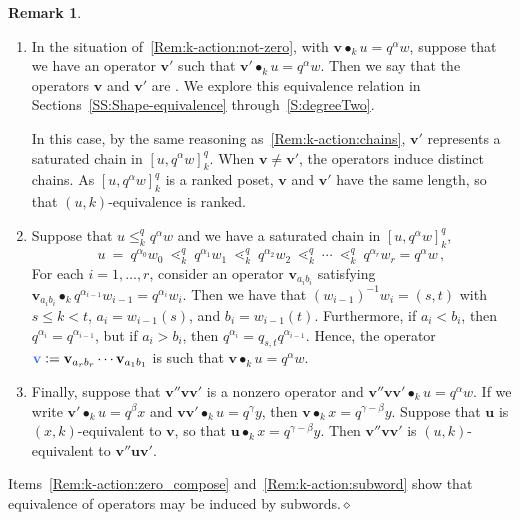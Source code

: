 \documentclass[12pt,oneside,reqno]{amsart}
\theoremstyle{definition}
\newtheorem{remark}[theorem]{Remark}
\numberwithin{equation}{section}
\newcommand{\qu}{{\mathbf u}}
\newcommand{\qv}{{\mathbf v}}
\DeclareMathOperator{\kactionop}{{\scriptstyle \bullet}}
\newcommand{\kaction}[1][k]{\kactionop_{#1}}
\newcommand{\defcolor}[1]{{\color{RoyalBlue}#1}}
\newcommand{\demph}[1]{\defcolor{{\sl #1}}}
\begin{document}
\begin{remark}
\begin{enumerate}[label=(\roman*)]
  \item\label{Rem:k-action:uk_equiv}
    In the situation of~\ref{Rem:k-action:not-zero}, with $\qv\kaction u=q^\alpha w$, suppose that 
    we have an operator $\qv'$ such that $\qv'\kaction u=q^\alpha w$.
    Then we say that the operators $\qv$ and $\qv'$ are \demph{$(u,k)$-equivalent}.
    We explore this equivalence relation in Sections~\ref{SS:Shape-equivalence} through~\ref{S:degreeTwo}. 

    In this case, by the same reasoning as~\ref{Rem:k-action:chains}, $\qv'$ represents a saturated chain in $[u,q^\alpha w]_k^q$.
    When $\qv\neq\qv'$, the operators induce distinct chains.
    As $[u,q^\alpha w]_k^q$ is a ranked poset, $\qv$ and $\qv'$ have the same length, so that $(u,k)$-equivalence is ranked.

  \item
    Suppose that $u\leq_k^q q^\alpha w$ and we have     a saturated chain in $[u,q^\alpha w]_k^q$, 
    \[
      u\ =\ q^{\alpha_0}w_0\ \lessdot_k^q\ q^{\alpha_1}w_1\ \lessdot_k^q\ q^{\alpha_2}w_2
      \ \lessdot_k^q\ \dotsb\  \lessdot_k^q\ q^{\alpha_r}w_r=q^\alpha w\,,
    \]
    For each $i=1,\dotsc,r$, consider an operator $\qv_{a_ib_i}$ satisfying $\qv_{a_ib_i}\kaction q^{\alpha_{i-1}}w_{i-1}=q^{\alpha_i}w_i$.
    Then we have that $(w_{i-1})^{-1}w_i=(s,t)$ with $s\leq k<t$,  $a_i=w_{i-1}(s)$, and $b_i=w_{i-1}(t)$.
    Furthermore, if $a_i<b_i$, then $q^{\alpha_i}=q^{\alpha_{i-1}}$, but if $a_i>b_i$, then  $q^{\alpha_i}=q_{s,t}q^{\alpha_{i-1}}$.
    Hence, the operator $\defcolor{\qv}\vcentcolon=\qv_{a_rb_r}\dotsb \qv_{a_1b_1}$ is such that
    $\qv\kaction u=q^\alpha w$.
    
  \item \label{Rem:k-action:subword}
    Finally, suppose that $\qv''\qv\qv'$ is a nonzero operator and $\qv''\qv\qv'\kaction u=q^\alpha w$.
    If we write $\qv'\kaction u=q^\beta x$ and $\qv\qv'\kaction u=q^\gamma y$, then $\qv\kaction x = q^{\gamma-\beta} y$.
    Suppose that $\qu$ is $(x,k)$-equivalent to $\qv$, so that $\qu\kaction x = q^{\gamma-\beta} y$.
    Then $\qv''\qv\qv'$ is $(u,k)$-equivalent to $\qv''\qu\qv'$.
    
\end{enumerate}

Items~\ref{Rem:k-action:zero_compose} and~\ref{Rem:k-action:subword} show that equivalence of operators may be induced by
subwords.\hfill$\diamond$ 
\end{remark}
\end{document}
